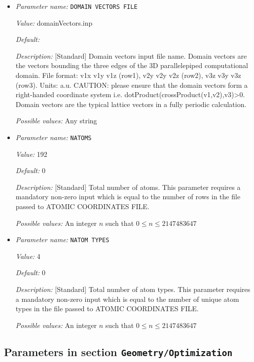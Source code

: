 \begin{itemize}
{\it Possible values:} Any string
\item {\it Parameter name:} {\tt DOMAIN VECTORS FILE}
\label{parameters:Geometry/DOMAIN VECTORS FILE}
\label{parameters:Geometry/DOMAIN_20VECTORS_20FILE}


{\it Value:} domainVectors.inp


{\it Default:} 


{\it Description:} [Standard] Domain vectors input file name. Domain vectors are the vectors bounding the three edges of the 3D parallelepiped computational domain. File format: v1x v1y v1z (row1), v2y v2y v2z (row2), v3z v3y v3z (row3). Units: a.u. CAUTION: please ensure that the domain vectors form a right-handed coordinate system i.e. dotProduct(crossProduct(v1,v2),v3)>0. Domain vectors are the typical lattice vectors in a fully periodic calculation.


{\it Possible values:} Any string
\item {\it Parameter name:} {\tt NATOMS}
\label{parameters:Geometry/NATOMS}


{\it Value:} 192


{\it Default:} 0


{\it Description:} [Standard] Total number of atoms. This parameter requires a mandatory non-zero input which is equal to the number of rows in the file passed to ATOMIC COORDINATES FILE.


{\it Possible values:} An integer $n$ such that $0\leq n \leq 2147483647$
\item {\it Parameter name:} {\tt NATOM TYPES}
\label{parameters:Geometry/NATOM TYPES}
\label{parameters:Geometry/NATOM_20TYPES}


{\it Value:} 4


{\it Default:} 0


{\it Description:} [Standard] Total number of atom types. This parameter requires a mandatory non-zero input which is equal to the number of unique atom types in the file passed to ATOMIC COORDINATES FILE.


{\it Possible values:} An integer $n$ such that $0\leq n \leq 2147483647$
\end{itemize}



\subsection{Parameters in section \tt Geometry/Optimization}
\label{parameters:Geometry/Optimization}

